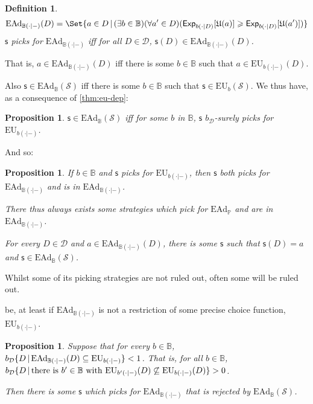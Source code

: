 \documentclass[a4paper]{article}
\newtheorem{definition}{Definition}
\newtheorem{proposition}[theorem]{Proposition}
\renewcommand\P{\mathbb{P}} %
\newcommand\Exp{\mathsf{Exp}}
\newcommand\EU{\mathrm{EU}}
\newcommand\EAd{\mathrm{EAd}}
\newcommand\U{\mathfrak{U}} %
\newcommand{\D}{\mathcal{D}}
\newcommand{\Decs}{\mathcal{D}}
\renewcommand\S{\mathcal{S}}
\newcommand\s{\mathsf{s}}
\newcommand{\IB}{\mathbb{B}}
\newcommand{\IP}{\P}
\newcommand{\todoold}[2][]{\todo[backgroundcolor=white,bordercolor=orange!10,linecolor=gray!10, #1,caption={},textcolor=gray]{Pre-rev: #2}}
\newcommand{\todooldinfo}[2][]{\todoold[#1]{#2}}
\renewcommand{\color}[1]{}
\newenvironment{colored}[1]{\leavevmode\color{#1}}{}
\newcommand{\Strategies}{\S}
\newcommand\SetDelimiter[1][]{
	\nonscript\,#1\vert \allowbreak \nonscript\,\mathopen{}}
\providecommand\given{\SetDelimiter}
\renewcommand{\geq}{\geqslant}
\newenvironment{CCM rewritten}
{\begingroup\color{blue}} %
{\endgroup}              %
\begin{document}

\begin{colored}{violet}


\begin{definition}
	$$\EAd_{\IB(\cdot|-)}(D) = \Set{a \in D \given (\exists b \in \IB)(\forall a' \in D)(\Exp_{b(\cdot|D)}[\U(a)]\geq\Exp_{b(\cdot|D)}[\U(a')])}
	$$
	$\s$ picks for $\EAd_{\IB(\cdot|-)}$ iff for all $D\in\Decs$, $\s(D)\in\EAd_{\IB(\cdot|-)}(D)$.
	\end{definition}
	That is, $a\in\EAd_{\IB(\cdot|-)}(D)$ iff there is some $b\in\IB$ such that $a\in\EU_{b(\cdot|-)}(D)$. 
	
	Also $\s\in\EAd_\IB(\Strategies)$ iff there is some $b\in\IB$ such that $\s\in\EU_b(\Strategies)$. 
	We thus have, as a consequence of \cref{thm:eu-dep}: 
	\begin{proposition}\label{thm:ead-equiv[dep]}
		$\s\in\EAd_\IB(\Strategies)$ iff for some $b$ in $\IB$, $\s$ $b_\Decs$-surely picks for $\EU_{b(\cdot|-)}$.
	\end{proposition}
	And so:
	 \begin{proposition}\label{thm:ead-existence[dep]}
	 	If $b\in\IB$ and $\s$ picks for $\EU_{b(\cdot|-)}$, then $\s$ both picks for $\EAd_{\IB(\cdot|-)}$ and is in $\EAd_{\IB(\cdot|-)}$.
	 	
	 	There thus always exists some strategies which pick for $\EAd_\IP$ and are in $\EAd_{\IB(\cdot|-)}$. 
		
		For every $D\in\Decs$ and $a\in\EAd_{\IB(\cdot|-)}(D)$, there is some $\s$ such that $\s(D)=a$ and $\s\in\EAd_\IB(\S)$. 
	\end{proposition}

	Whilst some of its picking strategies are not ruled out, often some will be ruled out. 
\end{colored}
	\begin{colored}{blue}
		
	be, at least if $\EAd_{\IB(\cdot|-)}$ is not a restriction of some precise choice function, $\EU_{b(\cdot|-)}$.
		\begin{proposition}\label{thm:ead-existsimpermissible[dep]}
Suppose that for every $b\in\IB$, $b_\D\{D\given \EAd_{\IB(\cdot|-)}(D)\subseteq\EU_{b(\cdot|-)}\}<1$. That is, for all $b\in \IB$, $b_\D\{D\given \text{there is $b'\in\IB$ with }\EU_{b'(\cdot|-)}(D)\not\subseteq\EU_{b(\cdot|-)}(D)\}>0$. 
	
	Then there is some $\s$ which picks for $\EAd_{\IB(\cdot|-)}$ that is rejected by $\EAd_\IB(\Strategies)$.
\end{proposition}
	\end{colored}
\end{document}
